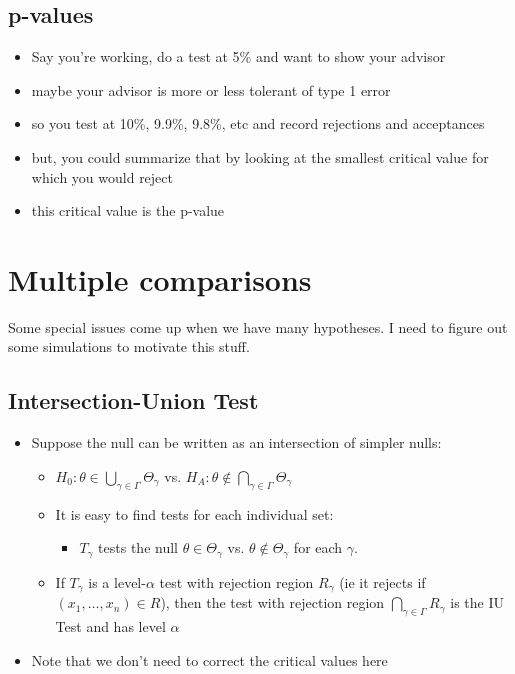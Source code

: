 \subsection{p-values}

\begin{itemize}
\item Say you're working, do a test at 5\% and want to show your advisor
\item maybe your advisor is more or less tolerant of type 1 error
\item so you test at 10\%, 9.9\%, 9.8\%, etc and record rejections and acceptances
\item but, you could summarize that by looking at the smallest critical value for which you would reject
\item this critical value is the p-value
\end{itemize}

\section{Multiple comparisons}

    Some special issues come up when we have many hypotheses.  I need
    to figure out some simulations to motivate this stuff.

\subsection{Intersection-Union Test}

\begin{itemize}
\item Suppose the null can be written as an intersection of simpler nulls:
\begin{itemize}
\item $H_0: \theta \in \bigcup_{\gamma \in \Gamma} \Theta_\gamma$ vs. 
         $H_A: \theta \notin \bigcap_{\gamma \in \Gamma} \Theta_\gamma$
\item It is easy to find tests for each individual set:
\begin{itemize}
\item $T_\gamma$ tests the null $\theta \in \Theta_\gamma$
           vs. $\theta \notin \Theta_\gamma$ for each $\gamma$.
\end{itemize}
\item If $T_\gamma$ is a level-$\alpha$ test with rejection region
         $R_\gamma$ (ie it rejects if $(x_1,\dots,x_n) \in R$), then
         the test with rejection region $\bigcap_{\gamma \in \Gamma}
         R_\gamma$ is the IU Test and has level $\alpha$
\end{itemize}
\item Note that we don't need to correct the critical values here
\end{itemize}

